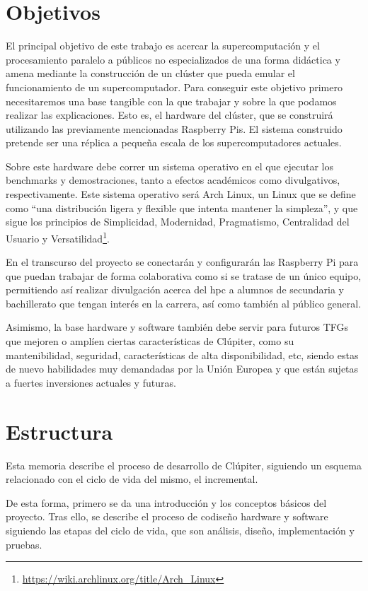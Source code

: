 \section{Objetivos}
\label{sec:objetivos}

El principal objetivo de este trabajo es acercar la supercomputación y el procesamiento paralelo a públicos no especializados de una forma didáctica y amena mediante la construcción de un clúster que pueda emular el funcionamiento de un supercomputador. Para conseguir este objetivo primero necesitaremos una base tangible con la que trabajar y sobre la que podamos realizar las explicaciones. Esto es, el hardware del clúster, que se construirá utilizando las previamente mencionadas Raspberry Pis. El sistema construido pretende ser una réplica a pequeña escala de los supercomputadores actuales.

Sobre este hardware debe correr un sistema operativo en el que ejecutar los benchmarks y demostraciones, tanto a efectos académicos como divulgativos, respectivamente. Este sistema operativo será Arch Linux, un Linux que se define como ``una distribución ligera y flexible que intenta mantener la simpleza'', y que sigue los principios de Simplicidad, Modernidad, Pragmatismo, Centralidad del Usuario y Versatilidad\footnote{\url{https://wiki.archlinux.org/title/Arch\_Linux}}.

En el transcurso del proyecto se conectarán y configurarán las Raspberry Pi para que puedan trabajar de forma colaborativa como si se tratase de un único equipo, permitiendo así realizar divulgación acerca del \acrshort{hpc} a alumnos de secundaria y bachillerato que tengan interés en la carrera, así como también al público general.

Asimismo, la base hardware y software también debe servir para futuros TFGs que mejoren o amplíen ciertas características de Clúpiter, como su mantenibilidad, seguridad, características de alta disponibilidad, etc, siendo estas de nuevo habilidades muy demandadas por la Unión Europea y que están sujetas a fuertes inversiones actuales y futuras.



\section{Estructura}
\label{sec:estructura}
Esta memoria describe el proceso de desarrollo de Clúpiter, siguiendo un esquema relacionado con el ciclo de vida del mismo, el incremental.

De esta forma, primero se da una introducción y los conceptos básicos del proyecto. Tras ello, se describe el proceso de codiseño hardware y software siguiendo las etapas del ciclo de vida, que son análisis, diseño, implementación y pruebas.

